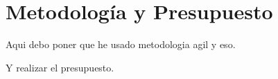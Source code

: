 \chapter{Metodología y Presupuesto}\label{ch:metodologia_y_presupuesto}
Aqui debo poner que he usado metodologia agil y eso.

Y realizar el presupuesto.